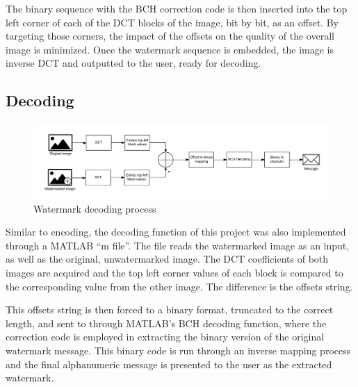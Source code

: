 The binary sequence with the BCH correction code is then inserted into the top left corner of each of the DCT blocks of the image, bit by bit, as an offset.
By targeting those corners, the impact of the offsets on the quality of the overall image is minimized.
Once the watermark sequence is embedded, the image is inverse DCT and outputted to the user, ready for decoding.

\subsection{Decoding}
\begin{figure}[tbph]
  \centering
  \includegraphics[width=0.95\linewidth]{graphics/decode}
  \caption{Watermark decoding process}
  \label{fig:decode}
\end{figure}

Similar to encoding, the decoding function of this project was also implemented through a MATLAB “m file”.
The file reads the watermarked image as an input, as well as the original, unwatermarked image.
The DCT coefficients of both images are acquired and the top left corner values of each block is compared to the corresponding value from the other image.
The difference is the offsets string.

This offsets string is then forced to a binary format, truncated to the correct length, and sent to through MATLAB’s BCH decoding function, where the correction code is employed in extracting the binary version of the original watermark message.
This binary code is run through an inverse mapping process and the final alphanumeric message is presented to the user as the extracted watermark.
